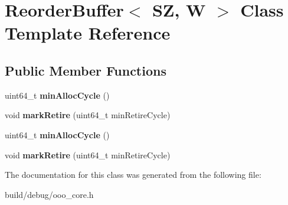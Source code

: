 \hypertarget{classReorderBuffer}{\section{Reorder\-Buffer$<$ S\-Z, W $>$ Class Template Reference}
\label{classReorderBuffer}
}
\subsection*{Public Member Functions}
\begin{DoxyCompactItemize}
\item 
\hypertarget{classReorderBuffer_aa510ddc1b2706437d779c447d6c0809a}{uint64\-\_\-t {\bfseries min\-Alloc\-Cycle} ()}\label{classReorderBuffer_aa510ddc1b2706437d779c447d6c0809a}

\item 
\hypertarget{classReorderBuffer_a9c42043d09b09f67e324b8244b9a1f3a}{void {\bfseries mark\-Retire} (uint64\-\_\-t min\-Retire\-Cycle)}\label{classReorderBuffer_a9c42043d09b09f67e324b8244b9a1f3a}

\item 
\hypertarget{classReorderBuffer_aa510ddc1b2706437d779c447d6c0809a}{uint64\-\_\-t {\bfseries min\-Alloc\-Cycle} ()}\label{classReorderBuffer_aa510ddc1b2706437d779c447d6c0809a}

\item 
\hypertarget{classReorderBuffer_a9c42043d09b09f67e324b8244b9a1f3a}{void {\bfseries mark\-Retire} (uint64\-\_\-t min\-Retire\-Cycle)}\label{classReorderBuffer_a9c42043d09b09f67e324b8244b9a1f3a}

\end{DoxyCompactItemize}


The documentation for this class was generated from the following file\-:\begin{DoxyCompactItemize}
\item 
build/debug/ooo\-\_\-core.\-h\end{DoxyCompactItemize}
